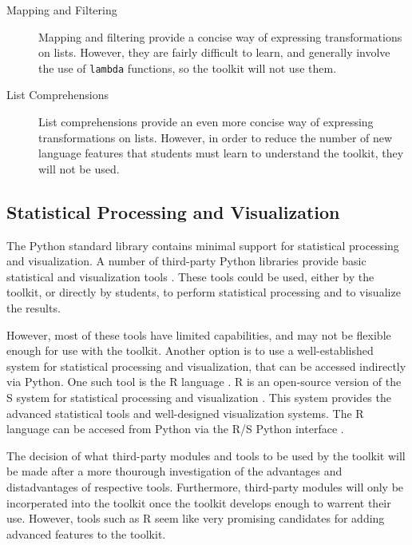 \documentclass{article}
\begin{document}
\begin{description}
  \item[Mapping and Filtering] Mapping and filtering provide a
  concise way of expressing transformations on lists.  However, they
  are fairly difficult to learn, and generally involve the use of
  \texttt{lambda} functions, so the toolkit will not use them.

  \item[List Comprehensions] List comprehensions provide an even more
  concise way of expressing transformations on lists.  However, in
  order to reduce the number of new language features that students
  must learn to understand the toolkit, they will not be used.

\end{description}

\subsection{Statistical Processing and Visualization}

The Python standard library contains minimal support for statistical
processing and visualization.  A number of third-party Python
libraries provide basic statistical and visualization tools
\cite{numpy, statspy, scipy, vtk}.  These tools could be used, either
by the toolkit, or directly by students, to perform statistical
processing and to visualize the results.

However, most of these tools have limited capabilities, and may not be
flexible enough for use with the toolkit.  Another option is to use a
well-established system for statistical processing and visualization,
that can be accessed indirectly via Python.  One such tool is the R
language \cite{r}.  R is an open-source version of the S system for
statistical processing and visualization \cite{s}.  This system
provides the advanced statistical tools and well-designed
visualization systems.  The R language can be accesed from Python via
the R/S Python interface \cite{rspython}.

The decision of what third-party modules and tools to be used by the
toolkit will be made after a more thourough investigation of the
advantages and distadvantages of respective tools.  Furthermore,
third-party modules will only be incorperated into the toolkit once
the toolkit develops enough to warrent their use.  However, tools such
as R seem like very promising candidates for adding advanced features
to the toolkit.

\end{document}
